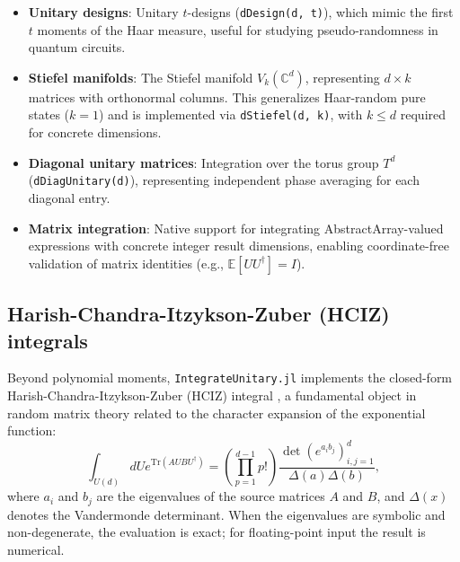 \documentclass[manuscript,screen]{acmart}
\begin{document}
\begin{itemize}
    $d$. These rely on Wick's theorem~\cite{wick1950evaluation} for integration
    rather than Weingarten calculus.
    \item \textbf{Unitary designs}: Unitary $t$-designs (\texttt{dDesign(d, t)}),
    which mimic the first $t$ moments of the Haar measure, useful for studying
    pseudo-randomness in quantum circuits.
    \item \textbf{Stiefel manifolds}: The Stiefel manifold $V_k(\mathbb{C}^d)$,
    representing $d \times k$ matrices with orthonormal columns. This
    generalizes Haar-random pure states ($k=1$) and is implemented via
    \texttt{dStiefel(d, k)}, with $k \le d$ required for concrete dimensions.
    \item \textbf{Diagonal unitary matrices}: Integration over the torus group
    $T^d$ (\texttt{dDiagUnitary(d)}), representing independent phase averaging for
    each diagonal entry.
    \item \textbf{Matrix integration}: Native support for integrating
    AbstractArray-valued expressions with concrete integer result dimensions,
    enabling coordinate-free validation of matrix identities (e.g.,
    $\mathbb{E}[U U^\dagger] = I$).
\end{itemize}

\subsection{Harish-Chandra-Itzykson-Zuber (HCIZ) integrals}
Beyond polynomial moments, \texttt{IntegrateUnitary.jl} implements the closed-form
Harish-Chandra-Itzykson-Zuber (HCIZ) integral \cite{harish1958ranges,
itzykson1980planar}, a fundamental object in random matrix theory related to the
character expansion of the exponential function:
\begin{equation}
\int_{U(d)} dU e^{\text{Tr}(A U B U^\dagger)} = \left( \prod_{p=1}^{d-1} p! \right) \frac{\det(e^{a_i b_j})_{i,j=1}^d}{\Delta(a) \Delta(b)},
\end{equation}
where $a_i$ and $b_j$ are the eigenvalues of the source matrices $A$ and $B$,
and $\Delta(x)$ denotes the Vandermonde determinant. When the eigenvalues are
symbolic and non-degenerate, the evaluation is exact; for floating-point input
the result is numerical.
\end{document}

